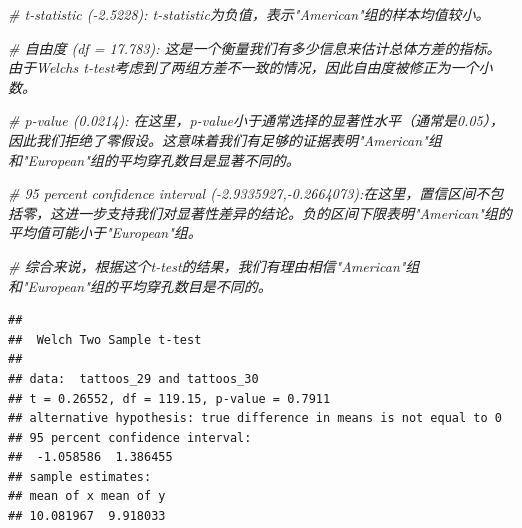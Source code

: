 \documentclass[
  hyperref,]{ctexart}
\newenvironment{Shaded}{\begin{snugshade}}{\end{snugshade}}
\newcommand{\CommentTok}[1]{\textcolor[rgb]{0.56,0.35,0.01}{\textit{#1}}}
\newcommand{\DecValTok}[1]{\textcolor[rgb]{0.00,0.00,0.81}{#1}}
\newcommand{\FunctionTok}[1]{\textcolor[rgb]{0.13,0.29,0.53}{\textbf{#1}}}
\newcommand{\NormalTok}[1]{#1}
\newcommand{\OtherTok}[1]{\textcolor[rgb]{0.56,0.35,0.01}{#1}}
\newcommand{\SpecialCharTok}[1]{\textcolor[rgb]{0.81,0.36,0.00}{\textbf{#1}}}
\begin{document}
\begin{Shaded}
\begin{Highlighting}[]
\CommentTok{\# t{-}statistic ({-}2.5228): t{-}statistic为负值，表示"American"组的样本均值较小。}

\CommentTok{\# 自由度 (df = 17.783): 这是一个衡量我们有多少信息来估计总体方差的指标。由于Welch\textquotesingle{}s t{-}test考虑到了两组方差不一致的情况，因此自由度被修正为一个小数。}

\CommentTok{\# p{-}value (0.0214): 在这里，p{-}value小于通常选择的显著性水平（通常是0.05），因此我们拒绝了零假设。这意味着我们有足够的证据表明"American"组和"European"组的平均穿孔数目是显著不同的。}

\CommentTok{\# 95 percent confidence interval ({-}2.9335927,{-}0.2664073):在这里，置信区间不包括零，这进一步支持我们对显著性差异的结论。负的区间下限表明"American"组的平均值可能小于"European"组。}

\CommentTok{\# 综合来说，根据这个t{-}test的结果，我们有理由相信"American"组和"European"组的平均穿孔数目是不同的。}
\end{Highlighting}
\end{Shaded}

\begin{Shaded}
\end{Shaded}

\begin{verbatim}
## 
##  Welch Two Sample t-test
## 
## data:  tattoos_29 and tattoos_30
## t = 0.26552, df = 119.15, p-value = 0.7911
## alternative hypothesis: true difference in means is not equal to 0
## 95 percent confidence interval:
##  -1.058586  1.386455
## sample estimates:
## mean of x mean of y 
## 10.081967  9.918033
\end{verbatim}
\end{document}
